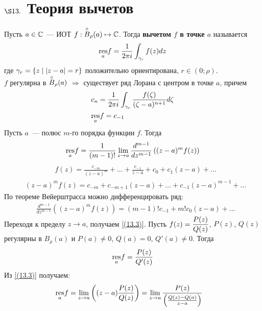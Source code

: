 \section{$\S 13.$ Теория вычетов}
\Def
Пусть $a \in \mathbb{C}$~--- ИОТ $f: \overset{\circ}{B}_\rho(a) \mapsto \mathbb{C}$. Тогда
\textbf{вычетом $f$ в точке $a$} называется
\begin{equation}\label{(13.1)}
    \underset{a}{\mathrm{res}}f = \frac{1}{2\pi i}\int_{\gamma_r}f(z)dz
\end{equation}
где $\gamma_r = \left\{{z \mid \left|{z-a}\right| = r}\right\}$ положительно ориентирована, $r \in
(0; \rho)$.
\\
\property
$f$ регулярна в $\overset{\circ}{B}_\rho(a)$ $\Rightarrow$ существует ряд Лорана с
центром в точке $a$, причем
\begin{equation}\label{(13.2)}
    \begin{split}
        & c_n = \frac{1}{2 \pi i}\int_{\gamma_r}\frac{f(\zeta)}{(\zeta - a)^{n+1}}d \zeta \\
        & \underset{a}{\mathrm{res}}f = c_{-1}
    \end{split}
\end{equation}
\lemma
Пусть $a$~--- полюс $m$-го порядка функции $f$. Тогда
\begin{equation}\label{(13.3)}
    \underset{a}{\mathrm{res}} f = \frac{1}{(m-1)!}\lim_{z \to a}\frac{d^{m-1}}{dz^{m-1}} \left( (z-a)^mf(z) \right)
\end{equation}
\pr
\begin{align*}
  & f(z) = \frac{c_{-m}}{(z-a)^m} + \dots + \frac{c_{-1}}{z-a} + c_0 + c_1(z-a) + \dots
\end{align*}
\begin{align*}
  & (z-a)^mf(z) = c_{-m}+ c_{-m+1}(z-a) + \dots + c_{-1}(z-a)^{m-1} + \dots
\end{align*}
По теореме Вейерштрасса можно дифференцировать ряд:
\begin{align*}
  & \frac{d^{m-1}}{dz^{m-1}}\left( (z-a)^mf(z)\right) = (m-1)!c_{-1} + m!c_0(z-a) + \dots
\end{align*}
Переходя к пределу $z \to a$, получаем \eqref{(13.3)}.
\lemma
Пусть $f(z) = \displaystyle \frac{P(z)}{Q(z)}$, $P(z)$, $Q(z)$ регулярны в $B_\rho(a)$ и
$P(a) \neq 0$, $Q(a) = 0$, $Q'(a) \neq 0$. Тогда
\begin{equation}\label{(13.4)}
    \underset{a}{\mathrm{res}} f = \frac{P(z)}{Q'(z)}
\end{equation}
\pr
Из \eqref{(13.3)} получаем:
\begin{align*}
  & \underset{a}{\mathrm{res}}f = \lim_{z\to a}\left( (z-a)\frac{P(z)}{Q(z)} \right) = \lim_{z \to a} \frac{P(z)}{\left( \frac{Q(z) - Q(a)}{z-a} \right)}
\end{align*}
